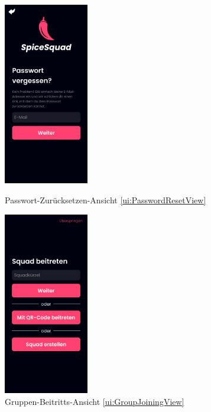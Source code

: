 \documentclass[parskip=full]{scrartcl}
\begin{document}
\begin{figure}[htp]
    \begin{minipage}
        [t]{0.49\textwidth}
        \centering
        \includegraphics[height=80mm]{images/ui/PasswordResetView.jpg}
        \caption{Passwort-Zurücksetzen-Ansicht \ref{ui:PasswordResetView}}
        \label{fig:PasswordResetView}
    \end{minipage}
    \begin{minipage}
        [t]{0.49\textwidth}
        \centering
        \includegraphics[height=80mm]{images/ui/GroupJoiningView.jpg}
        \caption{Gruppen-Beitritts-Ansicht \ref{ui:GroupJoiningView}}
        \label{fig:GroupJoiningView}
    \end{minipage}
\end{figure}
\end{document}
